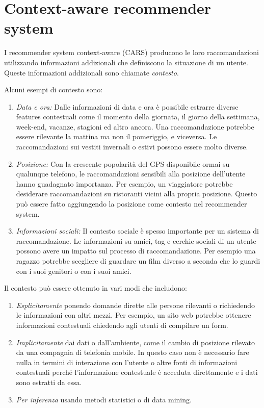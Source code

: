 \documentclass[12pt,italian]{report}
\begin{document}
\section{Context-aware recommender system}
I recommender system context-aware (CARS) producono le loro raccomandazioni utilizzando informazioni addizionali che definiscono la situazione di un utente. Queste informazioni addizionali sono chiamate \textit{contesto}.

\noindent Alcuni esempi di contesto sono:
\begin{enumerate}
 \item \textit{Data e ora:} Dalle informazioni di data e ora è possibile estrarre diverse features contestuali come il momento della giornata, il giorno della settimana, week-end, vacanze, stagioni ed altro ancora. Una raccomandazione potrebbe essere rilevante la mattina ma non il pomeriggio, e viceversa. Le raccomandazioni sui vestiti invernali o estivi possono essere molto diverse.
 \item \textit{Posizione:} Con la crescente popolarità del GPS disponibile ormai su qualunque telefono, le raccomandazioni sensibili alla posizione dell'utente hanno guadagnato importanza. Per esempio, un viaggiatore potrebbe desiderare raccomandazioni su ristoranti vicini alla propria posizione. Questo può essere fatto aggiungendo la posizione come contesto nel recommender system.
 \item \textit{Informazioni sociali:} Il contesto sociale è spesso importante per un sistema di raccomandazione. Le informazioni su amici, tag e cerchie sociali di un utente possono avere un impatto sul processo di raccomandazione. Per esempio una ragazzo potrebbe scegliere di guardare un film diverso a seconda che lo guardi con i suoi genitori o con i suoi amici.
\end{enumerate} 

\noindent Il contesto può essere ottenuto in vari modi \cite{recsys-handbook} che includono:
\begin{enumerate}
 \item \textit{Esplicitamente} ponendo domande dirette alle persone rilevanti o richiedendo le informazioni con altri mezzi. Per esempio, un sito web potrebbe ottenere informazioni contestuali chiedendo agli utenti di compilare un form.
 \item \textit{Implicitamente} dai dati o dall'ambiente, come il cambio di posizione rilevato da una compagnia di telefonia mobile. In questo caso non è necessario fare nulla in termini di interazione con l'utente o altre fonti di informazioni contestuali perché l'informazione contestuale è acceduta direttamente e i dati sono estratti da essa.
 \item \textit{Per inferenza} usando metodi statistici o di data mining. 
\end{enumerate}
\end{document}
